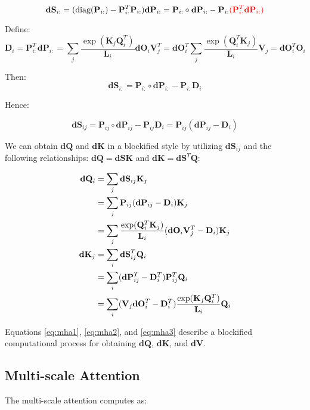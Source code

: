 $$\mathbf{dS}_{i:}=(\text{diag}(\mathbf{P}_{i:})-\mathbf{P}^T_{i:}\mathbf{P}_{i:})\mathbf{dP}_{i:}=\mathbf{P}_{i:}\circ \mathbf{dP}_{i:}-\mathbf{P}_{i:}\textcolor{red}{(\mathbf{P}_{i:}^T \mathbf{dP}_{i:})}$$

Define: $$\mathbf{D}_i=\mathbf{P}_{i:}^T\mathbf{dP}_{i:}=\sum_j\frac{\exp({\mathbf{K}_j\mathbf{Q}_i^T})}{\mathbf{L}_i}\mathbf{dO}_i \mathbf{V}_j^T=\mathbf{dO}_i^T\sum_j\frac{\exp({\mathbf{Q}_i^T}\mathbf{K}_j)}{\mathbf{L}_i}\mathbf{V}_j = \mathbf{dO}_i^T\mathbf{O}_i$$

Then:
$$\mathbf{dS}_{i:}=\mathbf{P}_{i:}\circ\mathbf{dP}_{i:}-\mathbf{P}_{i:}\mathbf{D}_i$$

Hence:

$$\mathbf{dS}_{ij}=\mathbf{P}_{ij}\circ\mathbf{dP}_{ij}-\mathbf{P}_{ij}\mathbf{D}_i=\mathbf{P}_{ij}(\mathbf{dP}_{ij}-\mathbf{D}_i)$$

We can obtain $\mathbf{dQ}$ and $\mathbf{dK}$ in a blockified style by utilizing $\mathbf{dS}_{ij}$ and the following relationships: $\mathbf{dQ}=\mathbf{dS}\mathbf{K}$ and $\mathbf{dK}=\mathbf{dS}^T\mathbf{Q}$:

\begin{align}
\mathbf{dQ}_i &= \sum_{j}\mathbf{dS}_{ij}\mathbf{K}_j \notag\\
&= \sum_{j}\mathbf{P}_{ij}(\mathbf{dP}_{ij}-\mathbf{D}_i)\mathbf{K}_j \notag\\
&=\sum_j\frac{\exp(\mathbf{Q}_i^T\mathbf{K}_j)}{\mathbf{L}_i}(\mathbf{dO}_i\mathbf{V}_j^T-\mathbf{D}_i)\mathbf{K}_j \label{eq:mha2}\\
\mathbf{dK}_j &= \sum_i\mathbf{dS}_{ij}^T\mathbf{Q}_i \notag\\
&= \sum_i(\mathbf{dP}_{ij}^T-\mathbf{D}_i^T)\mathbf{P}_{ij}^T\mathbf{Q}_i \notag\\
&= \sum_i (\mathbf{V}_{j}\mathbf{dO}_i^T -\mathbf{D}_i^T)\frac{\exp(\mathbf{K}_j\mathbf{Q}_i^T)}{\mathbf{L}_i}\mathbf{Q}_i \label{eq:mha3}
\end{align}

Equations \eqref{eq:mha1}, \eqref{eq:mha2}, and \eqref{eq:mha3} describe a blockified computational process for obtaining $\mathbf{dQ}$, $\mathbf{dK}$, and $\mathbf{dV}$.

\subsection{Multi-scale Attention}

The multi-scale attention computes as:

